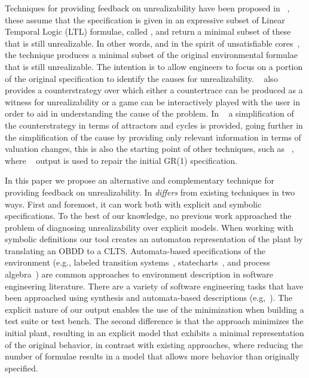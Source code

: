 Techniques for providing feedback on unrealizability have been proposed in ~\cite{DBLP:conf/fmcad/KonighoferHB09, DBLP:journals/scp/Schuppan12,DBLP:conf/fmcad/AlurMT13},
these assume that the specification is given in an expressive subset of Linear Temporal Logic (LTL) formulae, called \gr, and return a minimal subset of these that is still unrealizable. In other words, and in the spirit of unsatisfiable cores~\cite{Torlak:2008}, the technique produces a minimal subset of the original environmental formulae that is still unrealizable. The intention is to allow engineers to focus on a portion of the original specification to identify the causes for unrealizability. ~\cite{DBLP:conf/fmcad/KonighoferHB09} also provides a counterstrategy over which either a countertrace can be produced as a witness for unrealizability or a game can be interactively played with the user in order to aid in understanding the cause of the problem. In ~\cite{DBLP:conf/sigsoft/KuventMR17} a simplification of the counterstrategy in terms of attractors and cycles is provided, going further in the simplification of the cause by providing only relevant information in terms of valuation changes, this is also the starting point of other techniques, such as ~\cite{maoz2019symbolic}, where ~\cite{DBLP:conf/sigsoft/KuventMR17} output is used to repair the initial GR(1) specification.

In this paper we propose an alternative and complementary technique for providing feedback on unrealizability. In \textit{differs} from existing techniques in two ways. First and foremost, it can work both with explicit and symbolic specifications. To the best of our knowledge, no previous work approached the problem of diagnosing unrealizability over explicit models.  When working with symbolic definitions our tool creates an automaton representation of the plant by translating an OBDD to a CLTS. Automata-based specifications of the environment (e.g., labeled transition systems~\cite{Keller:1976}, statecharts~\cite{Harel:1987}, and process algebra~\cite{Milner:1982,Hoare:1983}) are common approaches to environment description in software engineering literature. There are a variety of software engineering tasks that have been approached using synthesis and automata-based descriptions (e.g,~\cite{Letier:2013:RMS,DIppolito:2013,Pistore:2004:PMW}). The explicit nature of our output enables the use of the minimization when building a test suite or test bench. The second difference is that the approach minimizes the initial plant, resulting in an explicit model that exhibits a minimal representation of the original behavior, in contrast with existing approaches, where reducing the number of formulae results in a model that allows more behavior than originally specified. 

